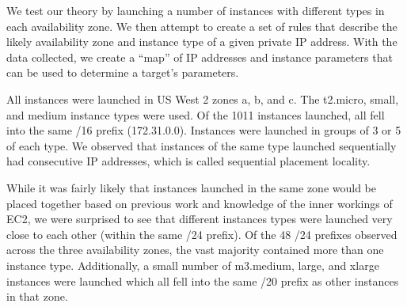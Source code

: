 \documentclass[conference]{IEEEtran}
\begin{document}
We test our theory by launching a number of instances with different types in each availability zone. 
We then attempt to create a set of rules that describe the likely availability zone and instance type of a given 
private IP address.  
With the data collected, we create a “map” of IP addresses and instance parameters that can be used to determine 
a target’s parameters.

All instances were launched in US West 2 zones a, b, and c. The t2.micro, small, and medium instance types 
were used. 
Of the 1011 instances launched, all fell into the same /16 prefix (172.31.0.0). 
Instances were launched 
in groups of 3 or 5 of each type. 
We observed that instances of the same type launched sequentially had consecutive IP addresses, which is called 
sequential placement locality. 

While it was fairly likely that instances launched in the same zone would be placed together based on previous 
work and knowledge of the inner workings of EC2, we were surprised to see that different instances types were launched 
very close to each other (within the same /24 prefix). 
Of the 48 /24 prefixes observed across the three availability zones, the vast majority contained more than one 
instance type. 
Additionally, a small number of m3.medium, large, and xlarge instances were launched which all fell into the same 
/20 prefix as other instances in that zone.
\end{document}
